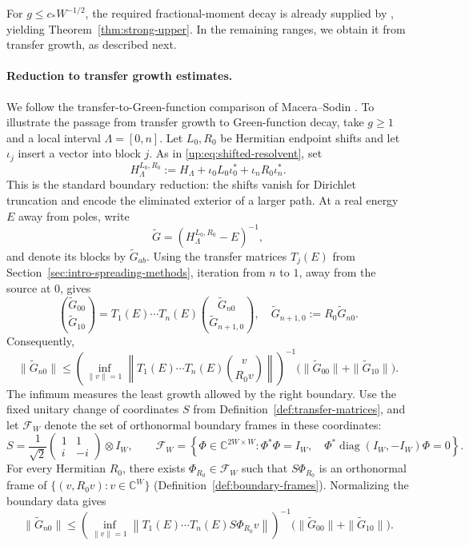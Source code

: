\documentclass[11pt]{article}
\numberwithin{equation}{section}
\theoremstyle{remark}
\newcommand{\C}{\mathbb C}
\newcommand{\diag}{\operatorname{diag}}
\begin{document}
For $g\le c_*W^{-1/2}$, the required fractional-moment decay is
already supplied by \cite[Theorem~1]{PSSS}, yielding
Theorem~\ref{thm:strong-upper}. In the remaining ranges,
we obtain it from transfer growth, as described next.

\paragraph{Reduction to transfer growth estimates.}
We follow the transfer-to-Green-function comparison of Macera--Sodin
\cite[Section~2.2]{MS}.
To illustrate the passage from transfer growth to Green-function decay,
take $g\ge1$ and a local interval $\Lambda=[0,n]$.
Let $L_0,R_0$ be Hermitian endpoint shifts and let $\iota_j$ insert
a vector into block $j$. As in \eqref{up:eq:shifted-resolvent}, set
\[
 H_\Lambda^{L_0,R_0}
 :=H_\Lambda+\iota_0L_0\iota_0^*
             +\iota_nR_0\iota_n^*.
\]
This is the standard boundary reduction: the shifts vanish for
Dirichlet truncation and encode the eliminated exterior of a larger
path. At a real energy $E$ away from poles, write
\[
 \widetilde G=(H_\Lambda^{L_0,R_0}-E)^{-1},
\]
and denote its blocks by $\widetilde G_{ab}$.
Using the transfer matrices $T_j(E)$ from
Section~\ref{sec:intro-spreading-methods}, iteration from $n$ to $1$,
away from the source at $0$, gives
\[
 \binom{\widetilde G_{00}}{\widetilde G_{10}}
 =T_1(E)\cdots T_n(E)
       \binom{\widetilde G_{n0}}{\widetilde G_{n+1,0}},\quad \widetilde G_{n+1,0}:=R_0\widetilde G_{n0}.
\]
Consequently,
\[
 \|\widetilde G_{n0}\|
 \le\left(\inf_{\|v\|=1}
   \left\|T_1(E)\cdots T_n(E)\binom{v}{R_0v}\right\|\right)^{-1}
   \bigl(\|\widetilde G_{00}\|+\|\widetilde G_{10}\|\bigr).
\]
The infimum measures the least growth allowed by the right boundary.
Use the fixed unitary change of coordinates $S$ from
Definition~\ref{def:transfer-matrices}, and let $\mathcal F_W$ denote
the set of orthonormal boundary frames in these coordinates:
\[
 S=\frac1{\sqrt2}\begin{pmatrix}1&1\\i&-i\end{pmatrix}\otimes I_W,
 \qquad
 \mathcal F_W=\left\{\Phi\in\C^{2W\times W}:
 \Phi^*\Phi=I_W,\quad
 \Phi^*\diag(I_W,-I_W)\Phi=0\right\}.
\]
For every Hermitian $R_0$, there exists $\Phi_{R_0}\in\mathcal F_W$
such that $S\Phi_{R_0}$ is an
orthonormal frame of $\{(v,R_0v):v\in\C^W\}$
(Definition~\ref{def:boundary-frames}). Normalizing the boundary data gives
\[
 \|\widetilde G_{n0}\|
 \le\left(\inf_{\|v\|=1}
   \left\|T_1(E)\cdots T_n(E)S\Phi_{R_0}v\right\|\right)^{-1}
   \bigl(\|\widetilde G_{00}\|+\|\widetilde G_{10}\|\bigr).
\]
\end{document}
